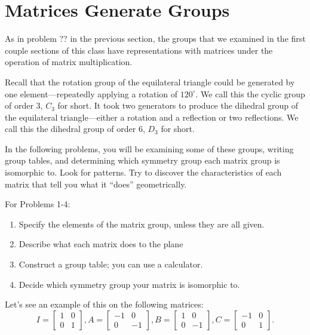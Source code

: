 \documentclass[../gatm.tex]{subfiles}
\begin{document}
\section{Matrices Generate Groups}

As in problem ?? in the previous section, the groups that we examined in the first couple sections of this class have representations with matrices under the operation of matrix multiplication.

Recall that the rotation group of the equilateral triangle could be generated by one element---repeatedly applying a rotation of $120^\circ$. We call this the cyclic group of order $3$, $C_3$ for short. It took two generators to produce the dihedral group of the equilateral triangle---either a rotation and a reflection or two reflections. We call this the dihedral group of order $6$, $D_3$ for short.

In the following problems, you will be examining some of these groups, writing group tables, and determining which symmetry group each matrix group is isomorphic to. Look for patterns. Try to discover the characteristics of each matrix that tell you what it ``does'' geometrically.

For Problems 1-4:
\begin{enumerate}[label=(\alph*)]
\item Specify the elements of the matrix group, unless they are all given.
\item Describe what each matrix does to the plane
\item Construct a group table; you can use a calculator.
\item Decide which symmetry group your matrix is isomorphic to.
\end{enumerate}

Let's see an example of this on the following matrices:
$$I=\left[\begin{array}{cc} 1 & 0 \\ 0 & 1 \end{array}\right], A=\left[\begin{array}{cc} -1 & 0 \\ 0 & -1 \end{array}\right], B=\left[\begin{array}{cc} 1 & 0 \\ 0 & -1 \end{array}\right], C=\left[\begin{array}{cc} -1 & 0 \\ 0 & 1 \end{array}\right].$$
\end{document}
